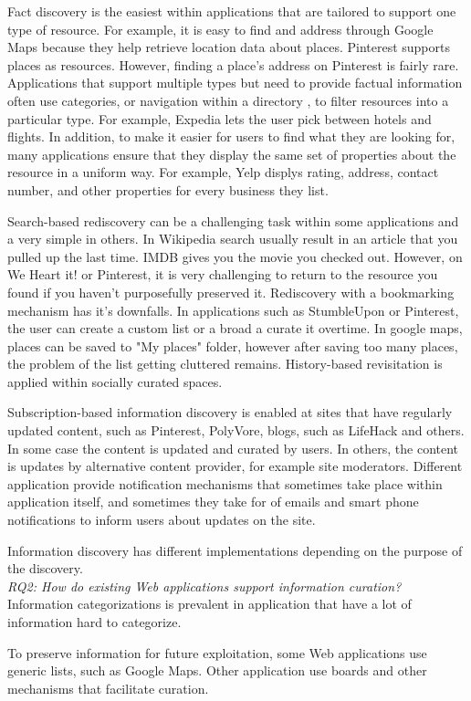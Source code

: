 \documentclass{casconpaper}
\begin{document}
{Fact discovery is the easiest within applications that are tailored to support one type of resource. For example, it is easy to find and address through Google Maps because they help retrieve location data about places. Pinterest supports places as resources. However, finding a place's address on Pinterest is fairly rare.  Applications that support multiple types but need to provide factual information often use categories, or navigation within a directory \cite{levene}, to filter resources into a particular type. For example, Expedia lets the user pick between hotels and flights. In addition, to make it easier for users to find what they are looking for, many applications ensure that they display the same set of properties about the resource in a uniform way. For example, Yelp displys rating, address, contact number, and other properties for every business they list.

Search-based rediscovery can be a challenging task within some applications and a very simple in others. In Wikipedia search usually result in an article that you pulled up the last time. IMDB gives you the movie you checked out. However, on We Heart it! or Pinterest, it is very challenging to return to the resource you found if you haven't purposefully preserved it. Rediscovery with a bookmarking mechanism has it's downfalls. In applications such as StumbleUpon or Pinterest, the user can create a custom list or a broad a curate it overtime. In google maps, places can be saved to "My places" folder, however after saving too many places, the problem of the list getting cluttered remains. History-based revisitation is applied within socially curated spaces.

Subscription-based information discovery is enabled at sites that have regularly updated content, such as Pinterest, PolyVore, blogs, such as LifeHack and others. In some case the content is updated and curated by users. In others, the content is updates by alternative content provider, for example site moderators. Different application provide notification mechanisms that sometimes take place within application itself, and sometimes they take for of emails and smart phone notifications to inform users about updates on the site.  

Information discovery has different implementations depending on the purpose of the discovery.\\

\emph{RQ2: How do existing Web applications support information curation?}\\

Information categorizations is prevalent in application that have a lot of information hard to categorize. 

To preserve information for future exploitation, some Web applications use generic lists, such as Google Maps. Other application use boards and other mechanisms that facilitate curation.

 
 
} %
\end{document}
